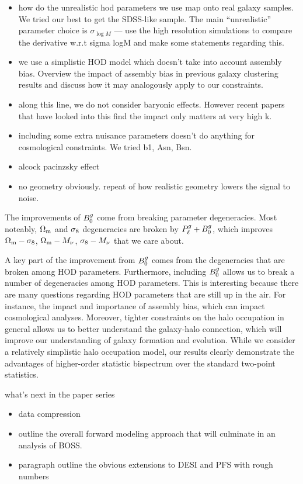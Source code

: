 \begin{itemize}
    \item how do the unrealistic hod parameters we use map onto real galaxy
        samples. We tried our best to get the SDSS-like sample. The main
        ``unrealistic'' parameter choice is $\sigma_{\log M}$ --- use the
        high resolution simulations to compare the derivative w.r.t sigma logM
        and make some statements regarding this. 
    \item we use a simplistic HOD model which doesn't take into account
        assembly bias. Overview the impact of assembly bias in previous galaxy
        clustering results and discuss how it may analogously apply to our
        constraints.
    \item along this line, we do not consider baryonic effects. However recent
        papers that have looked into this find the impact only matters at very
        high k.  
    \item including some extra nuisance parameters doesn't do anything for
        cosmological constraints. We tried b1, Asn, Bsn.  
    \item alcock pacinzsky effect
    \item no geometry obviously. repeat of how realistic geometry lowers the
        signal to noise. 
\end{itemize}

The improvements of $B^g_0$ come from breaking parameter degeneracies. 
Most noteably, $\Omega_{\rm m}$ and $\sigma_8$ degeneracies are broken by
$P^g_{\ell} + B^g_0$, which improves $\Omega_{\rm m} - \sigma_8$, $\Omega_{\rm m} - M_\nu$, $\sigma_8-M_\nu$ that we care about. 

A key part of the improvement from $B^g_0$ comes from the degeneracies that are
broken among HOD parameters. 
Furthermore, including $B^g_0$ allows us to break a number of degeneracies among
HOD parameters. This is interesting because there are many questions regarding
HOD parameters that are still up in the air. For instance, the impact and
importance of assembly bias, which can impact cosmological analyses. Moreover,
tighter constraints on the halo occupation in general allows us to better 
understand the galaxy-halo connection, which will improve our understanding of
galaxy formation and evolution. While we consider a relatively simplistic halo
occupation model, our results clearly demonstrate the advantages of
higher-order statistic bispectrum over the standard two-point statistics. 

what's next in the paper series 
\begin{itemize}
    \item data compression 
    \item outline the overall forward modeling approach that will culminate in
        an analysis of BOSS. 
    \item paragraph outline the obvious extensions to DESI and PFS with rough
        numbers 
\end{itemize}
